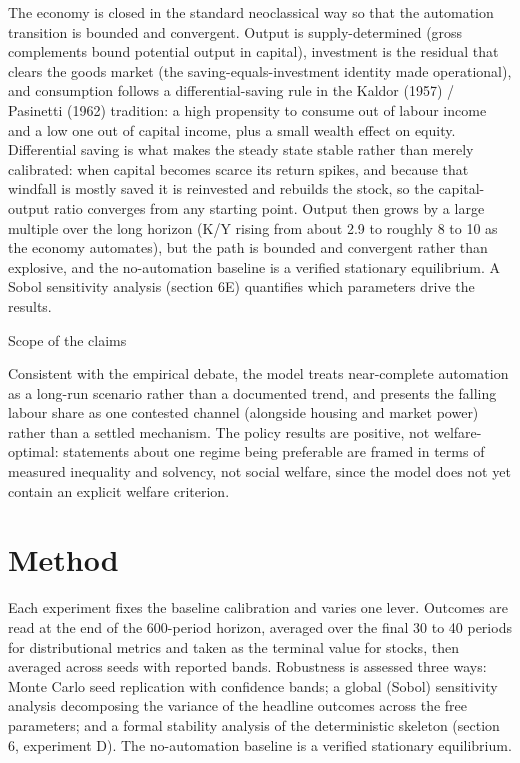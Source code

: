 \documentclass[11pt]{article}
\begin{document}
The economy is closed in the standard neoclassical way so that the
automation transition is bounded and convergent. Output is
supply-determined (gross complements bound potential output in capital),
investment is the residual that clears the goods market (the
saving-equals-investment identity made operational), and consumption
follows a differential-saving rule in the Kaldor (1957) / Pasinetti
(1962) tradition: a high propensity to consume out of labour income and
a low one out of capital income, plus a small wealth effect on equity.
Differential saving is what makes the steady state stable rather than
merely calibrated: when capital becomes scarce its return spikes, and
because that windfall is mostly saved it is reinvested and rebuilds the
stock, so the capital-output ratio converges from any starting point.
Output then grows by a large multiple over the long horizon (K/Y rising
from about 2.9 to roughly 8 to 10 as the economy automates), but the
path is bounded and convergent rather than explosive, and the
no-automation baseline is a verified stationary equilibrium. A Sobol
sensitivity analysis (section 6E) quantifies which parameters drive the
results.

Scope of the claims

Consistent with the empirical debate, the model treats near-complete
automation as a long-run scenario rather than a documented trend, and
presents the falling labour share as one contested channel (alongside
housing and market power) rather than a settled mechanism. The policy
results are positive, not welfare-optimal: statements about one regime
being preferable are framed in terms of measured inequality and
solvency, not social welfare, since the model does not yet contain an
explicit welfare criterion.

\hypertarget{method}{%
\section{Method}\label{method}}

Each experiment fixes the baseline calibration and varies one lever.
Outcomes are read at the end of the 600-period horizon, averaged over
the final 30 to 40 periods for distributional metrics and taken as the
terminal value for stocks, then averaged across seeds with reported
bands. Robustness is assessed three ways: Monte Carlo seed replication
with confidence bands; a global (Sobol) sensitivity analysis decomposing
the variance of the headline outcomes across the free parameters; and a
formal stability analysis of the deterministic skeleton (section 6,
experiment D). The no-automation baseline is a verified stationary
equilibrium.
\end{document}
